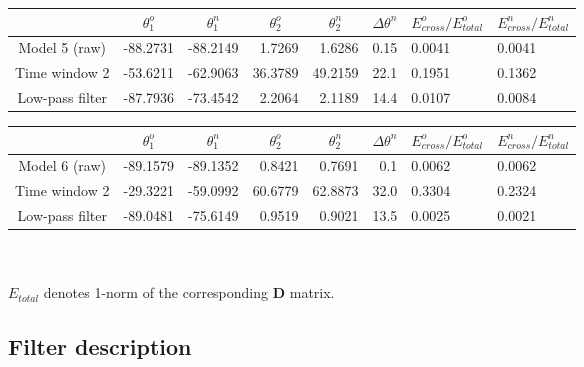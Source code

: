 \documentclass[a4paper,11pt]{article}
\begin{document}
\renewcommand{\arraystretch}{1.5}
\footnotesize
\begin{tabular}{c|rr|rr|r|ll}
				&\multicolumn{1}{c}{$\theta_1^o$} & \multicolumn{1}{c|}{$\theta_1^n$} & \multicolumn{1}{c}{$\theta_2^o$} & \multicolumn{1}{c|}{$\theta_2^n$} & \multicolumn{1}{c|}{$\Delta\theta^n$}& \multicolumn{1}{c}{$E_{cross}^o/E_{total}^o$} & \multicolumn{1}{c}{$E_{cross}^n/E_{total}^n$} \\ \hline
\hline  Model 5 (raw) & -88.2731 & -88.2149 & 1.7269 & 1.6286 & 0.15 & 0.0041 & 0.0041 \\
		Time window 2 & -53.6211 & -62.9063 & 36.3789 & 49.2159 & 22.1 & 0.1951 & 0.1362 \\
	   Low-pass filter & -87.7936 & -73.4542 & 2.2064 & 2.1189 & 14.4 & 0.0107 & 0.0084 \\ 	   
 	    \hline 
\end{tabular} 
\normalsize
\renewcommand{\arraystretch}{1.0}

\vspace{\baselineskip}

\renewcommand{\arraystretch}{1.5}
\footnotesize
\begin{tabular}{c|rr|rr|r|ll}
				&\multicolumn{1}{c}{$\theta_1^o$} & \multicolumn{1}{c|}{$\theta_1^n$} & \multicolumn{1}{c}{$\theta_2^o$} & \multicolumn{1}{c|}{$\theta_2^n$} & \multicolumn{1}{c|}{$\Delta\theta^n$}& \multicolumn{1}{c}{$E_{cross}^o/E_{total}^o$} & \multicolumn{1}{c}{$E_{cross}^n/E_{total}^n$} \\ \hline
\hline  Model 6 (raw) & -89.1579 & -89.1352 & 0.8421 & 0.7691 & 0.1 & 0.0062 & 0.0062 \\
		Time window 2 & -29.3221 & -59.0992 & 60.6779 & 62.8873 & 32.0 & 0.3304 & 0.2324 \\
	   Low-pass filter & -89.0481 & -75.6149 & 0.9519 & 0.9021 & 13.5 & 0.0025 & 0.0021 \\ 	   
 	    \hline 
\end{tabular} 
\normalsize
\\ \\
\quad *$E_{total}$ denotes 1-norm of the corresponding $\mathbf{D}$ matrix.
\renewcommand{\arraystretch}{1.0}

\vspace{\baselineskip}

\newpage

\subsection*{Filter description}
\end{document}
